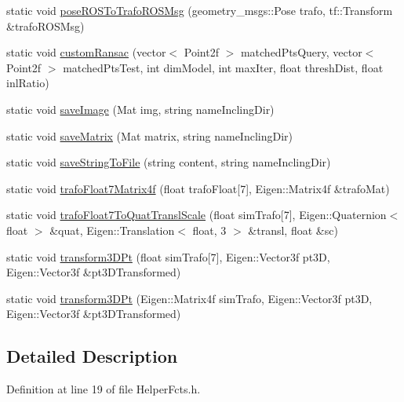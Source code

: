 \begin{DoxyCompactItemize}
\item 
static void \hyperlink{classHelperFcts_aa89f2cb609374b9846dcc312a4d05212}{pose\-R\-O\-S\-To\-Trafo\-R\-O\-S\-Msg} (geometry\-\_\-msgs\-::\-Pose trafo, tf\-::\-Transform \&trafo\-R\-O\-S\-Msg)
\item 
static void \hyperlink{classHelperFcts_acb1b3fdb2752c224b2323a836f5d29ab}{custom\-Ransac} (vector$<$ \-Point2f $>$ matched\-Pts\-Query, vector$<$ \-Point2f $>$ matched\-Pts\-Test, int dim\-Model, int max\-Iter, float thresh\-Dist, float inl\-Ratio)
\item 
static void \hyperlink{classHelperFcts_a62a2cbe4631785fe2e85c9131153d8f6}{save\-Image} (\-Mat img, string name\-Incling\-Dir)
\item 
static void \hyperlink{classHelperFcts_a64c4237c737ffe6a9f06194d65a762bc}{save\-Matrix} (\-Mat matrix, string name\-Incling\-Dir)
\item 
static void \hyperlink{classHelperFcts_a496060ba1f925b932814bdaafde769d5}{save\-String\-To\-File} (string content, string name\-Incling\-Dir)
\item 
static void \hyperlink{classHelperFcts_a06b2c2707f3a2172820946196a282d8a}{trafo\-Float7\-Matrix4f} (float trafo\-Float\mbox{[}7\mbox{]}, \-Eigen\-::\-Matrix4f \&trafo\-Mat)
\item 
static void \hyperlink{classHelperFcts_aca9eeaf896ec92535fbef642133a73fe}{trafo\-Float7\-To\-Quat\-Transl\-Scale} (float sim\-Trafo\mbox{[}7\mbox{]}, \-Eigen\-::\-Quaternion$<$ float $>$ \&quat, \-Eigen\-::\-Translation$<$ float, 3 $>$ \&transl, float \&sc)
\item 
static void \hyperlink{classHelperFcts_a63c33b2156813b25f1034b66985984bd}{transform3\-D\-Pt} (float sim\-Trafo\mbox{[}7\mbox{]}, \-Eigen\-::\-Vector3f pt3\-D, \-Eigen\-::\-Vector3f \&pt3\-D\-Transformed)
\item 
static void \hyperlink{classHelperFcts_a9145127a1996c642db5ffbf188238108}{transform3\-D\-Pt} (\-Eigen\-::\-Matrix4f sim\-Trafo, \-Eigen\-::\-Vector3f pt3\-D, \-Eigen\-::\-Vector3f \&pt3\-D\-Transformed)
\end{DoxyCompactItemize}


\subsection{\-Detailed \-Description}


\-Definition at line 19 of file \-Helper\-Fcts.\-h.




